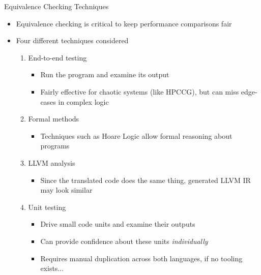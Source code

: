 \documentclass[10pt,aspectratio=169]{beamer}
\begin{document}
\begin{frame}{Equivalence Checking Techniques}
    \begin{itemize}
        \item Equivalence checking is critical to keep performance comparisons fair
        \item Four different techniques considered
        \begin{enumerate}
            \item<1-> \alert<5>{End-to-end testing}
            \begin{itemize}
                \item Run the program and examine its output
                \item Fairly effective for chaotic systems (like HPCCG), but can miss edge-cases in complex logic %
            \end{itemize}
            \item<2-> Formal methods
            \begin{itemize}
                \item Techniques such as Hoare Logic \cite{hoareAxiomaticBasisComputer1969} allow formal reasoning about programs
            \end{itemize}
            \item<3-> LLVM analysis
            \begin{itemize}
                \item Since the translated code does the same thing, generated LLVM IR may look similar
            \end{itemize}
            \item<4-> \alert<5>{Unit testing}
            \begin{itemize}
                \item Drive small code units and examine their outputs
                \item Can provide confidence about these units \textit{individually}
                \item Requires manual duplication across both languages, if no tooling exists...
            \end{itemize}
        \end{enumerate}
    \end{itemize}
\end{frame}
\end{document}
